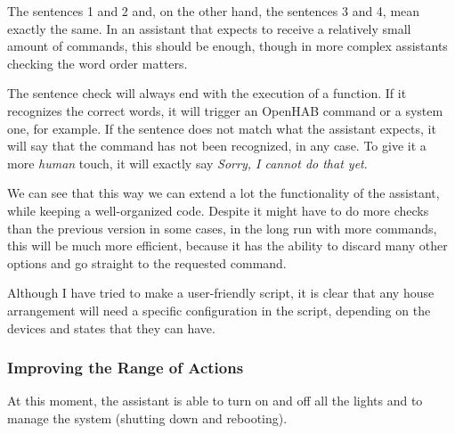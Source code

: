 The sentences 1 and 2 and, on the other hand, the sentences 3 and 4, mean exactly the same. In an assistant that expects to receive
a relatively small amount of commands, this should be enough, though in more complex assistants checking the word order matters.

The sentence check will always end with the execution of a function. If it recognizes the correct words, it will trigger an OpenHAB
command or a system one, for example. If the sentence does not match what the assistant expects, it will say that the command has
not been recognized, in any case. To give it a more \textit{human} touch, it will exactly say \textit{Sorry, I cannot do that yet}.

We can see that this way we can extend a lot the functionality of the assistant, while keeping a well-organized code. Despite it
might have to do more checks than the previous version in some cases, in the long run with more commands, this will be
much more efficient, because it has the ability to discard many other options and go straight to the requested command.

Although I have tried to make a user-friendly script, it is clear that any house arrangement will need a specific configuration in
the script, depending on the devices and states that they can have.

\subsubsection{Improving the Range of Actions}
At this moment, the assistant is able to turn on and off all the lights and to manage the system (shutting down and rebooting).

